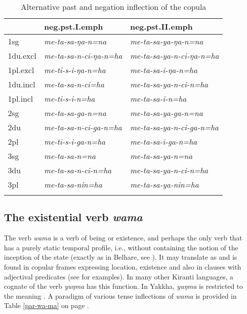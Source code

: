\begin{table}[htp]
\begin{centering}
\begin{tabular}{lll}
\lsptoprule
  & {\sc neg.pst.I.emph}  & {\sc neg.pst.II.emph} \\
\midrule
{\sc 1sg} & \it  me-ta-sa-ŋa-n=na  & \it  me-ta-sa-ya-ŋa-n=na\\
{\sc 1du.excl} & \it  me-ta-sa-n-ci-ŋa-n=ha  & \it  me-ta-sa-ya-n-ci-ŋa-n=ha\\
{\sc 1pl.excl} & \it   me-ti-s-i-ŋa-n=ha & \it  me-ta-sa-i-ŋa-n=ha\\
{\sc 1du.incl} & \it  me-ta-sa-n-ci=ha & \it  me-ta-sa-ya-n-ci-n=ha\\
{\sc 1pl.incl} & \it  me-ti-s-i-n=ha & \it  me-ta-sa-i-n=ha\\
\midrule
{\sc 2sg} & \it  me-ta-sa-ga-n=na & \it  me-ta-sa-ya-ga-n=na\\
{\sc 2du} & \it  me-ta-sa-n-ci-ga-n=ha & \it  me-ta-sa-ya-n-ci-ga-n=ha\\
{\sc 2pl} & \it   me-ti-s-i-ga-n=ha & \it  me-ta-sa-i-ga-n=ha\\
\midrule
{\sc 3sg} & \it  me-ta-sa-n=na & \it  me-ta-sa-ya-n=na\\
{\sc 3du} & \it  me-ta-sa-n-ci-n=ha & \it  me-ta-sa-ya-n-ci-n=ha\\
{\sc 3pl} & \it  me-ta-sa-nin=ha & \it  me-ta-sa-ya-nin=ha\\
\lspbottomrule
\end{tabular}
\end{centering}
\caption{Alternative past and negation inflection of the copula}\label{meti}
\end{table}



\subsection{The existential verb \emph{wama}}

The verb \emph{wama}  is  a verb of being or existence, and perhaps the only verb that has a purely static temporal profile, i.e., without containing the notion of the inception of the state (exactly as in Belhare, see \citet[212]{Bickel1996Aspect}). It may translate as  and is found in copular frames expressing location, existence and also in clauses with adjectival predicates (see \Next for examples). In many other Kiranti languages, a cognate of the verb \emph{yuŋma}  has this function. In Yakkha,  \emph{yuŋma} is restricted to the meaning . A paradigm of  various tense inflections of \emph{wama} is provided in Table \ref{par-wa-ma} on page \pageref{par-wa-ma}.

